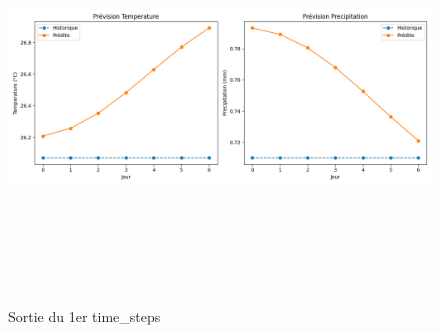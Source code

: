 \documentclass[a4paper,12pt,openany]{report}
\begin{document}
	\begin{figure}[H]
	\begin{center}
		 \begin{minipage}{\textwidth}
		    \begin{center}
		    \includegraphics[width=1\textwidth,height=4.3in]{images/time_steps10_vraiF.png}
		    \end{center}
		    \end{minipage}
		
		
		\caption{Sortie du 1er time\_steps \label{Fig 3.2}}
	\end{center}
\end{figure}%
\end{document}

